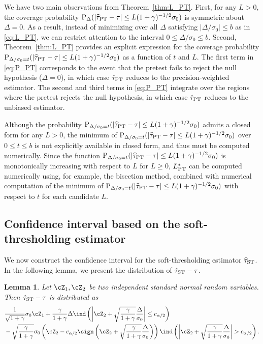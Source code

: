 \documentclass[11pt]{article}
\def\P{{\mathrm P}}
\newcommand{\htau}{\widehat\tau}
\numberwithin{equation}{section}
\newtheorem{lemma}{Lemma}[section]
\theoremstyle{definition}
\begin{document}
We have two main observations from Theorem~\ref{thm:L_PT}. First, for any $L>0$, the coverage probability $\P_\Delta(\lvert \htau_{\rm PT} - \tau \rvert \le L (1+\gamma)^{-1/2} \sigma_0)$ is symmetric about $\Delta=0$. As a result, instead of minimizing over all $\Delta$ satisfying $\lvert \Delta/\sigma_0 \rvert \le b$ as in \eqref{eq:L_PT}, we can restrict attention to the interval $0 \le \Delta/\sigma_0 \le b$. Second, Theorem~\ref{thm:L_PT} provides an explicit expression for the coverage probability $\P_{\Delta/\sigma_0 = t}(\lvert \htau_{\rm PT} - \tau \rvert \le L (1+\gamma)^{-1/2} \sigma_0)$ as a function of $t$ and $L$. The first term in \eqref{eq:P_PT} corresponds to the event that the pretest fails to reject the null hypothesis ($\Delta = 0$), in which case $\hat\tau_{\rm PT}$ reduces to the precision-weighted estimator. The second and third terms in \eqref{eq:P_PT} integrate over the regions where the pretest rejects the null hypothesis, in which case $\hat\tau_{\rm PT}$ reduces to the unbiased estimator.


Although the probability $\P_{\Delta/\sigma_0 = t}(\lvert \htau_{\rm PT} - \tau \rvert \le L (1+\gamma)^{-1/2} \sigma_0)$ admits a closed form for any $L > 0$, the minimum of $\P_{\Delta/\sigma_0 = t}(\lvert \htau_{\rm PT} - \tau \rvert \le L (1+\gamma)^{-1/2} \sigma_0)$ over $0 \le t \le b$ is not explicitly available in closed form, and thus must be computed numerically. Since the function $\P_{\Delta/\sigma_0 = t}(\lvert \htau_{\rm PT} - \tau \rvert \le L (1+\gamma)^{-1/2} \sigma_0)$ is monotonically increasing with respect to $L$ for $L \ge 0$, $L^*_{\rm PT}$ can be computed numerically using, for example, the bisection method, combined with numerical computation of the minimum of $\P_{\Delta/\sigma_0 = t}(\lvert \htau_{\rm PT} - \tau \rvert \le L (1+\gamma)^{-1/2} \sigma_0)$ with respect to $t$ for each candidate $L$. 

\subsection{Confidence interval based on the soft-thresholding estimator}


We now construct the confidence interval for the soft-thresholding estimator $\htau_{\rm ST}$. In the following lemma, we present the distribution of $\hat\tau_{\rm ST} - \tau$.

\begin{lemma}\label{lemma:clt_ST}
  Let $\cZ_1, \cZ_2$ be two independent standard normal random variables. Then $\hat\tau_{\rm ST} - \tau$ is distributed as
\begin{align*}
  &\frac{1}{\sqrt{1+\gamma}}\sigma_0\cZ_1 +  \frac{\gamma}{1+\gamma} \Delta\ind\left(\left\lvert \cZ_2 + \sqrt{\frac{\gamma}{1+\gamma}}\frac{\Delta}{\sigma_0}\right\rvert \le c_{\alpha/2}\right) \\
  &- \sqrt{\frac{\gamma}{1+\gamma}} \sigma_0\left(\cZ_2 - c_{\alpha/2}\sign\left(\cZ_2 + \sqrt{\frac{\gamma}{1+\gamma}}\frac{\Delta}{\sigma_0}\right)\right)\ind\left(\left\lvert \cZ_2 + \sqrt{\frac{\gamma}{1+\gamma}}\frac{\Delta}{\sigma_0}\right\rvert > c_{\alpha/2}\right).
\end{align*}
\end{lemma}
\end{document}
